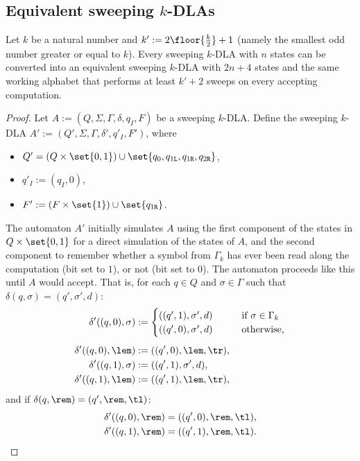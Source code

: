 \subsection{Equivalent sweeping \texorpdfstring{$k$}{k}-DLAs}
\begin{thrm}\label{thm:equiv-swep-dla}
	Let $k$ be a natural number and $k':=2\floor{\frac{k}{2}}+1$ (namely the smallest odd number greater or equal to $k$).
	Every sweeping $k$-DLA with $n$ states can be converted into an equivalent sweeping $k$-DLA with $2n+4$ states and the same working alphabet that performs at least $k'+2$ sweeps on every accepting computation.
\end{thrm}
\begin{proof}
	\newcommand{\ql}{q_{1\mathtt{L}}}
	\newcommand{\qr}{q_{1\mathtt{R}}}
	\newcommand{\qqr}{q_{2\mathtt{R}}}

	Let $A:=(Q,\Sigma,\Gamma,\delta,q_I,F)$ be a sweeping $k$-DLA.
	Define the sweeping $k$-DLA $A':=(Q',\Sigma,\Gamma,\delta',q'_I,F')$, where
	\begin{itemize}
		\item $Q'=(Q\times\set{0,1})\cup\set{q_0,\ql,\qr,\qqr}$,
		\item $q'_I:=(q_I,0)$,
		\item $F':=(F\times\set{1})\cup\set{\qr}$.
	\end{itemize}

	The automaton $A'$ initially simulates $A$ using the first component of the states in $Q\times\set{0,1}$ for a direct simulation of the states of $A$, and the second component to remember whether a symbol from $\Gamma_k$ has ever been read along the computation (bit set to $1$), or not (bit set to $0$).
	The automaton proceeds like this until $A$ would accept.
	That is, for each $q\in Q$ and $\sigma\in\Gamma$ such that $\delta(q,\sigma)=(q',\sigma',d)$:
	\begin{align*}
		\delta'((q,0),\sigma) & :=\begin{cases}
			                          ((q',1),\sigma',d) \qquad & \text{if }\sigma\in\Gamma_k \\
			                          ((q',0),\sigma',d) \qquad & \text{otherwise,}
		                          \end{cases} \\[1ex]
		\delta'((q,0),\lem)   & :=((q',0),\lem,\tr) \text,                                \\
		\delta'((q,1),\sigma) & :=((q',1),\sigma',d) \text,                               \\
		\delta'((q,1),\lem)   & :=((q',1),\lem,\tr) \text,
	\end{align*}
	and if $\delta(q,\rem)=(q',\rem,\tl)$:
	\begin{align*}
		\delta'((q,0),\rem) & =((q',0),\rem,\tl) \text, \\
		\delta'((q,1),\rem) & =((q',1),\rem,\tl) \text.
	\end{align*}


\end{proof}
